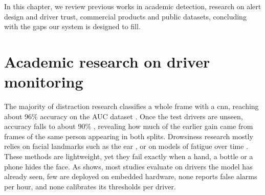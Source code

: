 In this chapter, we review previous works in academic detection, research on alert design and driver trust, commercial products and public datasets, concluding with the gaps our system is designed to fill.

\section{Academic research on driver monitoring}

The majority of distraction research classifies a whole frame with a \gls{cnn}, reaching about 96\% accuracy on the AUC dataset \cite{r32,r34}. Once the test drivers are unseen, accuracy falls to about 90\% \cite{r33}, revealing how much of the earlier gain came from frames of the same person appearing in both splits. Drowsiness research mostly relies on facial landmarks such as the \gls{ear} \cite{r35,r40,r41}, or on models of fatigue over time \cite{r37}. These methods are lightweight, yet they fail exactly when a hand, a bottle or a phone hides the face. As  shows, most studies evaluate on drivers the model has already seen, few are deployed on embedded hardware, none reports false alarms per hour, and none calibrates its thresholds per driver.



